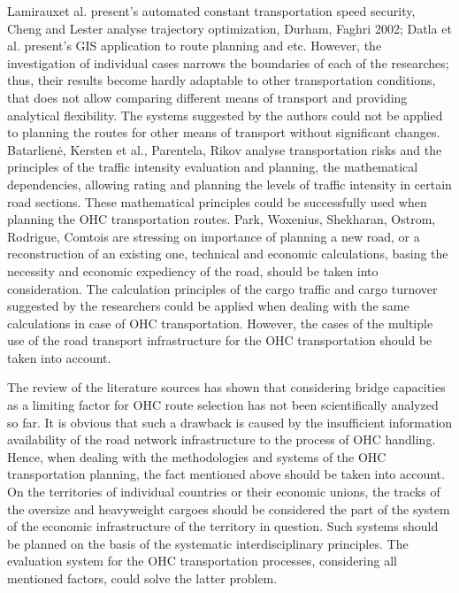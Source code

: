Lamirauxet al. present’s automated constant transportation speed security, Cheng and Lester analyse trajectory optimization, Durham, Faghri 2002; Datla et al. present’s GIS application to route planning and etc. However, the investigation of individual cases narrows the boundaries of each of the researches; thus, their results become hardly adaptable to other transportation conditions, that does not allow comparing different means of transport and providing analytical flexibility. The systems suggested by the authors could not be applied to planning the routes for other means of transport without significant changes.  Batarlienė, Kersten et al., Parentela, Rikov analyse transportation risks and the principles of the traffic intensity evaluation and planning, the mathematical dependencies, allowing rating and planning the levels of traffic intensity in certain road sections. These mathematical principles could be successfully used when planning the OHC transportation routes. Park, Woxenius, Shekharan, Ostrom, Rodrigue, Comtois are stressing on importance of planning a new road, or a reconstruction of an existing one, technical and economic calculations, basing the necessity and economic expediency of the road, should be taken into consideration. The calculation principles of the cargo traffic and cargo turnover suggested by the researchers could be applied when dealing with the same calculations in case of OHC  transportation. However, the cases of the multiple use of the road transport infrastructure for the OHC transportation should be taken into account. 

The review of the literature sources has shown that considering bridge capacities as a limiting factor for OHC route selection has not been scientifically analyzed so far. It is obvious that such a drawback is caused by the insufficient information availability of the road network infrastructure to the process of OHC handling. Hence, when dealing with the methodologies and systems of the OHC transportation planning, the fact mentioned above should be taken into account. On the territories of individual countries or their economic unions, the tracks of the oversize and heavyweight cargoes should be considered the part of the system of the economic infrastructure of the territory in question. Such systems should be planned on the basis of the systematic interdisciplinary principles. The evaluation system for the OHC transportation processes, considering all mentioned factors, could solve the latter problem. 